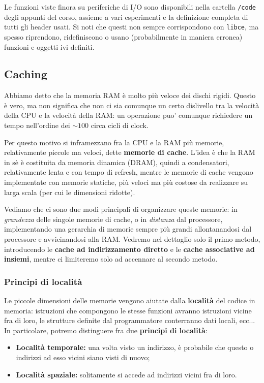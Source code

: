 \documentclass[a4paper,11pt]{article}
\begin{document}
Le funzioni viste finora su periferiche di I/O sono disponibili nella cartella \lstinline|/code| degli appunti del corso, assieme a vari esperimenti e la definizione completa di tutti gli header usati.
Si noti che questi non sempre corrispondono con \lstinline|libce|, ma spesso riprendono, ridefiniscono o usano (probabilmente in maniera erronea) funzioni e oggetti ivi definiti.

\subsection{Caching}
Abbiamo detto che la memoria RAM è molto più veloce dei dischi rigidi.
Questo è vero, ma non significa che non ci sia comunque un certo dislivello tra la velocità della CPU e la velocità della RAM: un operazione puo' comunque richiedere un tempo nell'ordine dei $\sim 100$ circa cicli di clock.

Per questo motivo si inframezzano fra la CPU e la RAM più memorie, relativamente piccole ma veloci, dette \textbf{memorie di cache}.
L'idea è che la RAM in sè è costituita da memoria dinamica (DRAM), quindi a condensatori, relativamente lenta e con tempo di refresh, mentre le memorie di cache vengono implementate con memorie statiche, più veloci ma più costose da realizzare su larga scala (per cui le dimensioni ridotte).

Vediamo che ci sono due modi principali di organizzare queste memorie: in \textit{grandezza} delle singole memorie di cache, o in \textit{distanza} dal processore, implementando una gerarchia di memorie sempre più grandi allontanandosi dal processore e avvicinandosi alla RAM.
Vedremo nel dettaglio solo il primo metodo, introducendo le \textbf{cache ad indirizzamento diretto} e le \textbf{cache associative ad insiemi}, mentre ci limiteremo solo ad accennare al secondo metodo.

\subsubsection{Principi di località}
Le piccole dimensioni delle memorie vengono aiutate dalla \textbf{località} del codice in memoria: istruzioni che compongono le stesse funzioni avranno istruzioni vicine fra di loro, le strutture definite dal programmatore conterranno dati locali, ecc...
In particolare, potremo distinguere fra due \textbf{principi di località}:
\begin{itemize}
	\item \textbf{Località temporale:} una volta visto un indirizzo, è probabile che questo o indirizzi ad esso vicini siano visti di nuovo;
	\item \textbf{Località spaziale:} solitamente si accede ad indirizzi vicini fra di loro.
\end{itemize}
\end{document}
